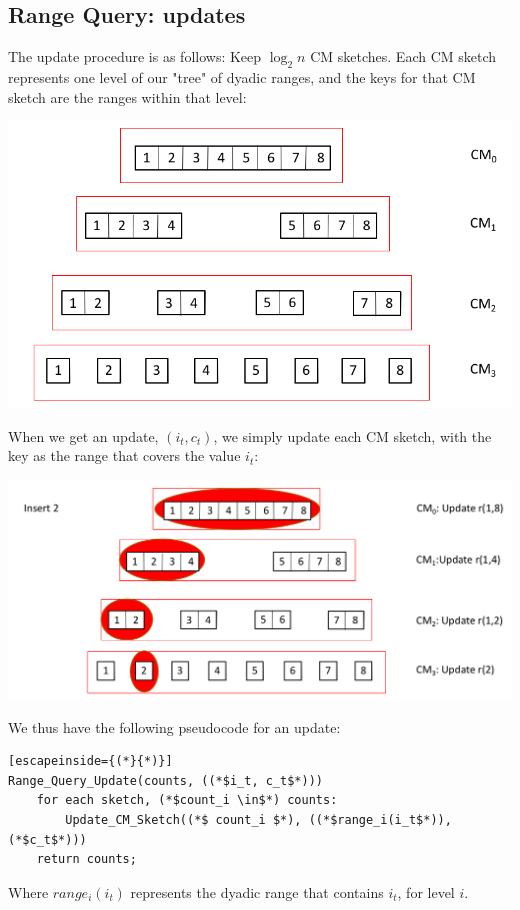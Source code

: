 \documentclass[11pt]{article}
\begin{document}
{\subsection{Range Query: updates}
The update procedure is as follows: Keep $\log_2n$ CM sketches. Each CM sketch represents one level of our "tree" of dyadic ranges, and the keys for that CM sketch are the ranges within that level:
\begin{center}\includegraphics[scale=0.3]{dyadic_ranges_cm.png}\end{center}
When we get an update, $(i_t, c_t)$, we simply update each CM sketch, with the key as the range that covers the value $i_t$:
\begin{center}\includegraphics[scale=0.3]{range_update.png}\end{center}
We thus have the following pseudocode for an update:
\newpage
\begin{lstlisting}[escapeinside={(*}{*)}]
Range_Query_Update(counts, ((*$i_t, c_t$*)))
    for each sketch, (*$count_i \in$*) counts:
        Update_CM_Sketch((*$ count_i $*), ((*$range_i(i_t$*)), (*$c_t$*)))
    return counts;
\end{lstlisting}
Where $range_i(i_t)$ represents the dyadic range that contains $i_t$, for level $i$.
}
\end{document}
